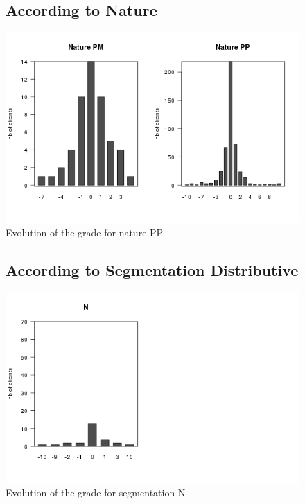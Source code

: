 \documentclass[a4paper, 11pt]{article}
\begin{document}
    \begin{figure}[!ht]
			\subsection{According to Nature}
            \centering
            \includegraphics[height = 10 cm]{Remi/Evolution_of_the_grade_for_nature_PP.png}
            \caption{Evolution of the grade for nature PP}
            \label{fig:e_PP}
    \end{figure}

    \begin{figure}[!ht]
			\subsection{According to Segmentation Distributive}
            \centering
            \includegraphics[height = 10 cm]{Remi/Evolution_of_the_grade_for_segmentation_N.png}
            \caption{Evolution of the grade for segmentation N}
            \label{fig:e_seg_N}
    \end{figure}
\end{document}
